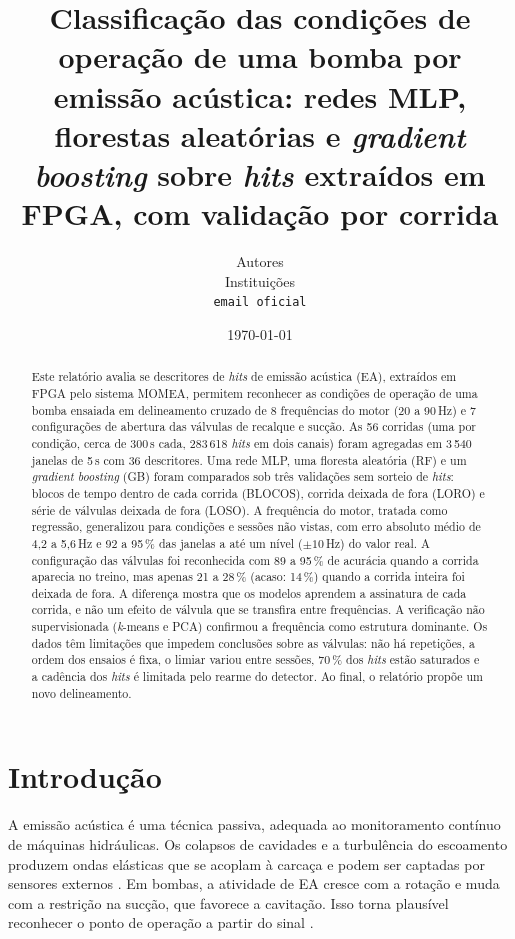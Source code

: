 \documentclass[12pt]{article}
\title{\textbf{Classificação das condições de operação de uma bomba por emissão acústica: redes MLP, florestas aleatórias e \textit{gradient boosting} sobre \textit{hits} extraídos em FPGA, com validação por corrida}}
\date{\today}
\author{Autores \\ Instituições \\ \texttt{email oficial}}
\begin{document}
\maketitle

\begin{abstract}
Este relatório avalia se descritores de \textit{hits} de emissão acústica (EA), extraídos em FPGA pelo sistema MOMEA, permitem reconhecer as condições de operação de uma bomba ensaiada em delineamento cruzado de 8 frequências do motor (20 a 90\,Hz) e 7 configurações de abertura das válvulas de recalque e sucção. As 56 corridas (uma por condição, cerca de 300\,s cada, 283\,618 \textit{hits} em dois canais) foram agregadas em 3\,540 janelas de 5\,s com 36 descritores. Uma rede MLP, uma floresta aleatória (RF) e um \textit{gradient boosting} (GB) foram comparados sob três validações sem sorteio de \textit{hits}: blocos de tempo dentro de cada corrida (BLOCOS), corrida deixada de fora (LORO) e série de válvulas deixada de fora (LOSO). A frequência do motor, tratada como regressão, generalizou para condições e sessões não vistas, com erro absoluto médio de 4,2 a 5,6\,Hz e 92 a 95\,\% das janelas a até um nível (\(\pm 10\)\,Hz) do valor real. A configuração das válvulas foi reconhecida com 89 a 95\,\% de acurácia quando a corrida aparecia no treino, mas apenas 21 a 28\,\% (acaso: 14\,\%) quando a corrida inteira foi deixada de fora. A diferença mostra que os modelos aprendem a assinatura de cada corrida, e não um efeito de válvula que se transfira entre frequências. A verificação não supervisionada (\textit{k}-means e PCA) confirmou a frequência como estrutura dominante. Os dados têm limitações que impedem conclusões sobre as válvulas: não há repetições, a ordem dos ensaios é fixa, o limiar variou entre sessões, 70\,\% dos \textit{hits} estão saturados e a cadência dos \textit{hits} é limitada pelo rearme do detector. Ao final, o relatório propõe um novo delineamento.
\end{abstract}

\section{Introdução}
\label{sec:introducao}

A emissão acústica é uma técnica passiva, adequada ao monitoramento contínuo de máquinas hidráulicas. Os colapsos de cavidades e a turbulência do escoamento produzem ondas elásticas que se acoplam à carcaça e podem ser captadas por sensores externos \cite{brennen1995,neill1997,alfayez2005}. Em bombas, a atividade de EA cresce com a rotação e muda com a restrição na sucção, que favorece a cavitação. Isso torna plausível reconhecer o ponto de operação a partir do sinal \cite{neill1997,alfayez2005,derakhshan1991}.
\end{document}
